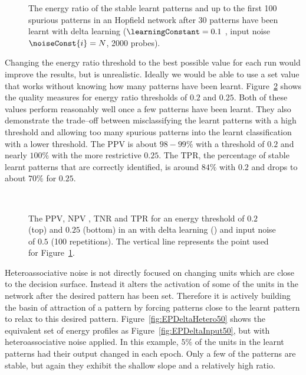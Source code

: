 \begin{figure}[tb]
\center
\small
	
	\caption{The energy ratio of the stable learnt patterns and up to the first 100 spurious patterns in an  Hopfield network after 30 patterns have been learnt with delta learning ($\learningConstant =0.1$ , input noise $\noiseConst{i}=N$, 2000 probes).}
	\label{fig:ERInputmeasure30}
\end{figure}

Changing the energy ratio threshold to the best possible value for each run would improve the results, but is unrealistic. Ideally we would be able to use a set value that works without knowing how many patterns have been learnt. Figure~\ref{fig:ERInputmeasure0-49} shows the quality measures for energy ratio thresholds of $0.2$ and $0.25$.  Both of these values perform reasonably well once a few patterns have been learnt.  They also demonstrate the trade--off between misclassifying the learnt patterns with a high threshold and allowing too many spurious patterns into the learnt classification with a lower threshold.  The PPV is about $98-99\%$ with a threshold of $0.2$ and nearly $100\%$ with the more restrictive $0.25$.  The TPR, the percentage of stable learnt patterns that are correctly identified, is around $84\%$ with $0.2$ and drops to about $70\%$ for $0.25$.

\begin{figure}[p]
 \center
 \small
	
  \vspace{1cm}\\
	
	\caption{The PPV, NPV , TNR and TPR for an energy threshold of $0.2$ (top) and $0.25$ (bottom) in an  with delta learning () and input noise of $0.5$ (100 repetitions). The vertical line represents the point used for Figure~\ref{fig:ERInputmeasure30}.}
	\label{fig:ERInputmeasure0-49}
\end{figure}

Heteroassociative noise is not directly focused on changing units which are close to the decision surface.  Instead it alters the activation of some of the units in the network after the desired pattern has been set.  Therefore it is actively building the basin of attraction of a pattern by forcing patterns close to the learnt pattern to relax to this desired pattern. Figure~\ref{fig:EPDeltaHetero50} shows the equivalent set of energy profiles as Figure~\ref{fig:EPDeltaInput50}, but with heteroassociative noise applied. In this example, $5\%$ of the units in the learnt patterns had their output changed in each epoch. Only a few of the patterns are stable, but again they exhibit the shallow slope and a relatively high ratio.  

